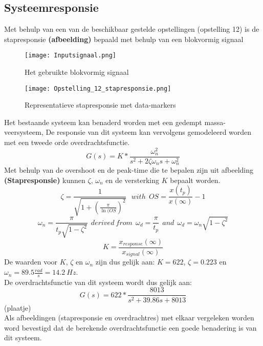 \documentclass[a4paper]{article}
\begin{document}
\subsection{Systeemresponsie}
Met behulp van een van de beschikbaar gestelde opstellingen (opstelling 12) is de stapresponsie \textbf{(afbeelding)} bepaald met behulp van een blokvormig signaal
\begin{figure}[h]
  \centering
    \texttt{[image: Inputsignaal.png]}
    \caption{Het gebruikte blokvormig signaal}
\end{figure}

\begin{figure}[h]
  \centering
    \texttt{[image: Opstelling\_12\_stapresponsie.png]}
    \caption{Representatieve stapresponsie met data-markers}
\end{figure}

Het bestaande systeem kan benaderd worden met een gedempt massa-veersysteem, De responsie van dit systeem kan vervolgens gemodeleerd worden met een tweede orde overdrachtsfunctie. 
\begin{equation}
G(s) = K * \frac{\omega_n^2}{s^2 + 2 \zeta \omega_n s + \omega_n^2}
\end{equation}
Met behulp van de overshoot en de peak-time die te bepalen zijn uit afbeelding \textbf{(Stapresponsie)} kunnen $\zeta$, $\omega_n$ en de versterking $K$ bepaalt worden.
\begin{equation}
\zeta = \frac{1}{\sqrt{1 + (\frac{\pi}{\ln(OS})^2}} \ \ \ with \ \ OS = \frac{x(t_p)}{x(\infty)} -1
\end{equation}
\begin{equation}
\omega_n = \frac{\pi}{t_p \sqrt{1 - \zeta^2}} \ \ derived \ from \ \ \omega_d = \frac{\pi}{t_p} \ \ and \ \ \omega_d = \omega_n \sqrt{1-\zeta^2}
\end{equation}
\begin{equation}
K = \frac{x_{response}(\infty)}{x_{signal}(\infty)}
\end{equation}
De waarden voor $K$, $\zeta$ en $\omega_n$ zijn dus gelijk aan: $ K = 622$, 
$\zeta = 0.223$ en $\omega_n = 89.5 \frac{rad}{s} = 14.2 \ Hz$.\\
De overdrachtsfunctie van dit systeem wordt dus gelijk aan:
\begin{equation}
G(s) = 622 * \frac{8013}{s^2 + 39.86 s + 8013}
\end{equation}
(plaatje) \\
Als afbeeldingen (stapresponsie en overdrachtres) met elkaar vergeleken worden word bevestigd dat de berekende overdrachtsfunctie een goede benadering is van dit systeem. 
\end{document}
